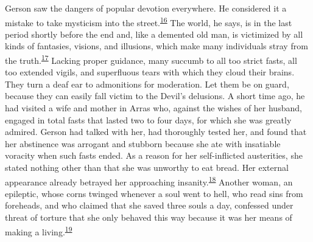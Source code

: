Gerson saw the dangers of popular devotion everywhere. He considered it
a mistake to take mysticism into the
street.\textsuperscript{\protect\hypertarget{15_Chapter_Eight__RELIGIOUS_EXCITAT.xhtmlux5cux23id_875}{\protect\hyperlink{23_NOTES.xhtmlux5cux23id_876}{16}}}
The world, he says, is in the last period shortly before the end and,
like a demented old man, is victimized by all kinds of fantasies,
visions, and illusions, which make many individuals stray from the
truth.\textsuperscript{\protect\hypertarget{15_Chapter_Eight__RELIGIOUS_EXCITAT.xhtmlux5cux23id_873}{\protect\hyperlink{23_NOTES.xhtmlux5cux23id_874}{17}}}
Lacking proper guidance, many succumb to all too strict fasts, all too
extended vigils, and superfluous tears with which they cloud their
brains. They turn a deaf ear to admonitions for moderation. Let them be
on guard, because they can easily fall victim to the Devil's delusions.
A short time ago, he had visited a wife and mother in Arras who, against
the wishes of her husband, engaged in total fasts that lasted two to
four days, for which she was greatly admired. Gerson had talked with
her, had thoroughly tested her, and found that her abstinence was
arrogant and stubborn because she ate with insatiable voracity when such
fasts ended. As a reason for her self-inflicted austerities, she stated
nothing other than that she was unworthy to eat bread. Her external
appearance already betrayed her approaching
insanity.\textsuperscript{\protect\hypertarget{15_Chapter_Eight__RELIGIOUS_EXCITAT.xhtmlux5cux23id_871}{\protect\hyperlink{23_NOTES.xhtmlux5cux23id_872}{18}}}
Another woman, an epileptic, whose corns twinged whenever a soul went to
hell, who read sins from foreheads, and who claimed that she saved three
souls a day, confessed under threat of torture that she only behaved
this way because it was her means of making a
living.\textsuperscript{\protect\hypertarget{15_Chapter_Eight__RELIGIOUS_EXCITAT.xhtmlux5cux23id_869}{\protect\hyperlink{23_NOTES.xhtmlux5cux23id_870}{19}}}

